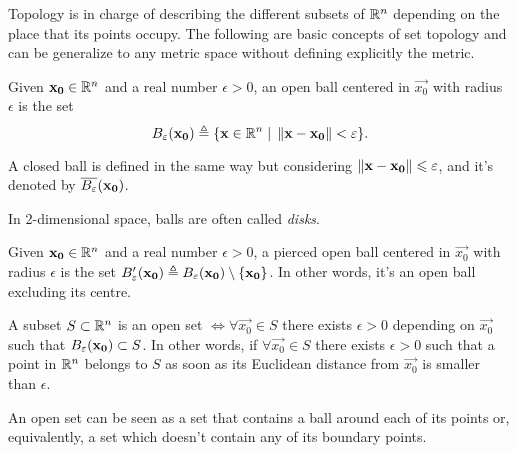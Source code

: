 Topology is in charge of describing the different subsets of $\Rtn$ depending on the place that its points occupy. The
following are basic concepts of set topology and can be generalize to any metric space without defining explicitly the metric.

\begin{defn}\label{def:open-ball}
Given $\vec{x_0}\in\Rtn$ and a real number $\epsilon > 0$, an open ball centered in $\vec{x_0}$ with radius $\epsilon$ is the set
\begin{equation}
B_\epsilon\argopen(\vec{x_0}\argclose)\bydef\{\vec{x}\in\Rtn\st\vnorm{\vec{x} - \vec{x_0}} < \epsilon\}.
\end{equation}
\end{defn}

\begin{remark}
    A closed ball is defined in the same way but considering $\left\Vert \mathbf{x} - \mathbf{x_0} \right\Vert\leqslant\varepsilon$, and it's denoted 
    by $\cball{\epsilon}{\vec{x_0}}$.
\end{remark}

\begin{note}
	In 2-dimensional space, balls are often called \textit{disks}.
\end{note}

\begin{defn}
Given $\vec{x_0}\in\Rtn$ and a real number $\epsilon > 0$, a pierced open ball centered in $\vec{x_0}$ with radius $\epsilon$ is the
set $B'_\epsilon\argopen(\vec{x_0}\argclose)\bydef B_\epsilon\argopen(\vec{x_0}\argclose)\setminus\{\vec{x_0}\}$. In other words, it's an 
open ball excluding its centre.
\end{defn}

\begin{defn}\label{def:open-set}
    A subset $S\subset\Rtn$ is an open set $\iff\forall\vec{x_0}\in S$ there exists $\epsilon > 0$ depending on $\vec{x_0}$ 
    such that $B_\epsilon\argopen(\vec{x_0}\argclose)\subset S$. In other words, if $\forall\vec{x_0}\in S$ there exists 
    $\epsilon > 0$ such that a point in $\Rtn$ belongs to $S$ as soon as its Euclidean distance from $\vec{x_0}$ is smaller 
    than $\epsilon$. 
\end{defn}

\begin{note}
An open set can be seen as a set that contains a ball around each of its points or, equivalently, a set which doesn't contain any of
its boundary points.
\end{note}

